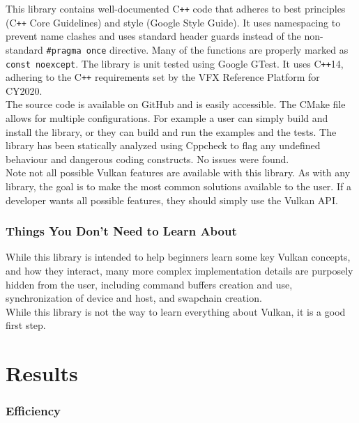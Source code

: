 \documentclass[12pt]{report}
\newcommand{\cpp}{C\texttt{++}}
\theoremstyle{definition}
\begin{document}
      This library contains well-documented \cpp{} code that adheres to best
      principles (\cpp{} Core Guidelines) and style (Google Style Guide). It
      uses namespacing to prevent name clashes and uses standard header guards
      instead of the non-standard \verb|#pragma once| directive. Many of the
      functions are properly marked as \verb!const noexcept!. The library is unit
      tested using Google GTest. It uses \cpp14, adhering to the \cpp{}
      requirements set by the VFX Reference Platform for CY2020. \\

      The source code is available on GitHub and is easily accessible. The CMake
      file allows for multiple configurations. For example a user can simply
      build and install the library, or they can build and run the examples
      and the tests. The library has been statically analyzed using Cppcheck to
      flag any undefined behaviour and dangerous coding constructs. No issues
      were found. \\

      Note not all possible Vulkan features are available with this library.
      As with any library, the goal is to make the most common solutions
      available to the user. If a developer wants all possible features,
      they should simply use the Vulkan API.

      \subsection{Things You Don't Need to Learn About}

        While this library is intended to help beginners learn some key Vulkan
        concepts, and how they interact, many more complex implementation details
        are purposely hidden from the user, including command buffers creation and
        use, synchronization of device and host, and swapchain creation. \\

        While this library is not the way to learn everything about Vulkan, it
        is a good first step.

  \chapter{Results}

    \subsection{Efficiency}
\end{document}

